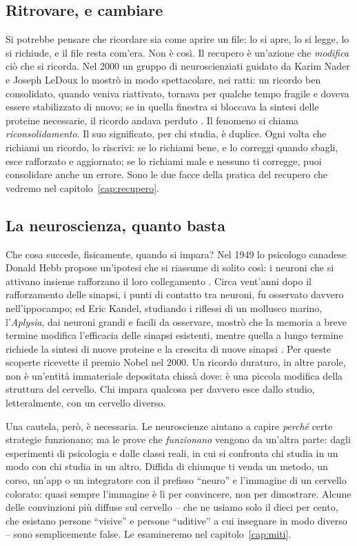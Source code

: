 \subsection*{Ritrovare, e cambiare}

Si potrebbe pensare che ricordare sia come aprire un file: lo si apre,
lo si legge, lo si richiude, e il file resta com'era. Non è così. Il
recupero è un'azione che \emph{modifica} ciò che si ricorda. Nel 2000 un gruppo di neuroscienziati guidato da Karim Nader e Joseph
LeDoux lo mostrò in modo spettacolare, nei ratti: un ricordo ben
consolidato, quando veniva riattivato, tornava per qualche tempo
fragile e doveva essere stabilizzato di nuovo; se in quella finestra si
bloccava la sintesi delle proteine necessarie, il ricordo andava
perduto \parencite{nader2000}. Il fenomeno si chiama
\emph{riconsolidamento}. Il suo significato, per chi studia, è
duplice. Ogni volta che richiami un ricordo, lo riscrivi: se lo
richiami bene, e lo correggi quando sbagli, esce rafforzato e
aggiornato; se lo richiami male e nessuno ti corregge, puoi
consolidare anche un errore. Sono le due facce della pratica del
recupero che vedremo nel capitolo~\ref{cap:recupero}.

\subsection*{La neuroscienza, quanto basta}

Che cosa succede, fisicamente, quando si impara? Nel 1949 lo psicologo
canadese Donald Hebb propose un'ipotesi che si riassume di solito così:
i neuroni che si attivano insieme rafforzano il loro collegamento
\parencite{hebb1949}. Circa vent'anni dopo il rafforzamento delle
sinapsi, i punti di contatto tra neuroni, fu osservato davvero
nell'ippocampo; ed Eric Kandel, studiando i riflessi di un mollusco
marino, l'\emph{Aplysia}, dai neuroni grandi e facili da osservare,
mostrò che la memoria a breve termine modifica l'efficacia delle
sinapsi esistenti, mentre quella a lungo termine richiede la sintesi di
nuove proteine e la crescita di nuove sinapsi \parencite{kandel2001}.
Per queste scoperte ricevette il premio Nobel nel 2000. Un ricordo
duraturo, in altre parole, non è un'entità immateriale depositata
chissà dove: è una piccola modifica della struttura del cervello. Chi
impara qualcosa per davvero esce dallo studio, letteralmente, con un
cervello diverso.

Una cautela, però, è necessaria. Le neuroscienze aiutano a capire
\emph{perché} certe strategie funzionano; ma le prove che
\emph{funzionano} vengono da un'altra parte: dagli esperimenti di
psicologia e dalle classi reali, in cui si confronta chi studia in un
modo con chi studia in un altro. Diffida di chiunque ti venda un
metodo, un corso, un'app o un integratore con il prefisso
\enquote{neuro} e l'immagine di un cervello colorato: quasi sempre
l'immagine è lì per convincere, non per dimostrare. Alcune delle
convinzioni più diffuse sul cervello -- che ne usiamo solo il dieci per
cento, che esistano persone \enquote{visive} e persone
\enquote{uditive} a cui insegnare in modo diverso -- sono semplicemente
false. Le esamineremo nel capitolo~\ref{cap:miti}.


